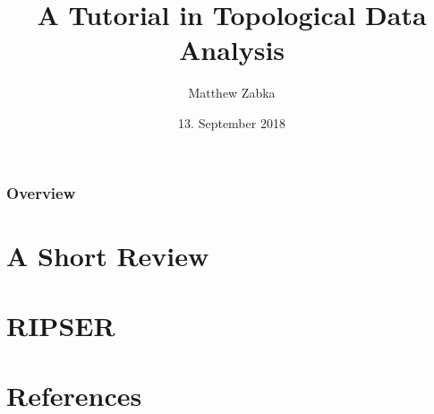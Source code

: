 \documentclass[handout]{beamer}
\title{A Tutorial in Topological Data Analysis} %
\author{Matthew Zabka}
\institute[SMSU] %
{
}
\date{13. September 2018} %
\begin{document}
\begin{frame}
\titlepage %
\end{frame}
\begin{frame}
\frametitle{Overview} %
\tableofcontents 
\end{frame}
\section{A Short Review}

\section{RIPSER}

\section{References}
\begin{frame}


\end{frame}
\end{document}
